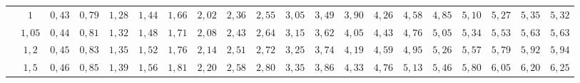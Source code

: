 \begin{table}[]
{\begin{tabular}{|c|c|c|c|c|c|c|c|c|c|c|c|c|c|c|c|c|c|c|c|}
                        & $1$                                                                                 & \cellcolor[HTML]{FFCCC9}$0,43$ & \cellcolor[HTML]{FFCCC9}$0,79$ & \cellcolor[HTML]{FFCCC9}$1,28$ & \cellcolor[HTML]{FFCCC9}$1,44$ & \cellcolor[HTML]{FFCCC9}$1,66$ & \cellcolor[HTML]{FD6864}$2,02$ & \cellcolor[HTML]{FD6864}$2,36$ & \cellcolor[HTML]{FD6864}$2,55$ & \cellcolor[HTML]{FE0000}$3,05$ & \cellcolor[HTML]{FE0000}$3,49$ & \cellcolor[HTML]{FE0000}$3,90$ & \cellcolor[HTML]{CB0000}$4,26$ & \cellcolor[HTML]{CB0000}$4,58$                        & \cellcolor[HTML]{9A0000}$4,85$ & \cellcolor[HTML]{9A0000}$5,10$ & \cellcolor[HTML]{F8A102}$5,27$ & \cellcolor[HTML]{F8A102}$5,35$ & \cellcolor[HTML]{F56B00}$5,32$ \\ \cline{2-20} 
                        & $1,05$                                                                              & \cellcolor[HTML]{FFCCC9}$0,44$ & \cellcolor[HTML]{FFCCC9}$0,81$ & \cellcolor[HTML]{FFCCC9}$1,32$ & \cellcolor[HTML]{FFCCC9}$1,48$ & \cellcolor[HTML]{FFCCC9}$1,71$ & \cellcolor[HTML]{FD6864}$2,08$ & \cellcolor[HTML]{FD6864}$2,43$ & \cellcolor[HTML]{FD6864}$2,64$ & \cellcolor[HTML]{FE0000}$3,15$ & \cellcolor[HTML]{FE0000}$3,62$ & \cellcolor[HTML]{FE0000}$4,05$ & \cellcolor[HTML]{CB0000}$4,43$ & \cellcolor[HTML]{CB0000}$4,76$                        & \cellcolor[HTML]{9A0000}$5,05$ & \cellcolor[HTML]{9A0000}$5,34$ & \cellcolor[HTML]{F8A102}$5,53$ & \cellcolor[HTML]{F8A102}$5,63$ & \cellcolor[HTML]{F56B00}$5,63$ \\ \cline{2-20} 
                        & $1,2$                                                                               & \cellcolor[HTML]{FFCCC9}$0,45$ & \cellcolor[HTML]{FFCCC9}$0,83$ & \cellcolor[HTML]{FFCCC9}$1,35$ & \cellcolor[HTML]{FFCCC9}$1,52$ & \cellcolor[HTML]{FFCCC9}$1,76$ & \cellcolor[HTML]{FD6864}$2,14$ & \cellcolor[HTML]{FD6864}$2,51$ & \cellcolor[HTML]{FD6864}$2,72$ & \cellcolor[HTML]{FE0000}$3,25$ & \cellcolor[HTML]{FE0000}$3,74$ & \cellcolor[HTML]{FE0000}$4,19$ & \cellcolor[HTML]{CB0000}$4,59$ & \cellcolor[HTML]{CB0000}$4,95$                        & \cellcolor[HTML]{9A0000}$5,26$ & \cellcolor[HTML]{9A0000}$5,57$ & \cellcolor[HTML]{F8A102}$5,79$ & \cellcolor[HTML]{F8A102}$5,92$ & \cellcolor[HTML]{F56B00}$5,94$ \\ \cline{2-20} 
                        & $1,5$                                                                               & \cellcolor[HTML]{FFCCC9}$0,46$ & \cellcolor[HTML]{FFCCC9}$0,85$ & \cellcolor[HTML]{FFCCC9}$1,39$ & \cellcolor[HTML]{FFCCC9}$1,56$ & \cellcolor[HTML]{FFCCC9}$1,81$ & \cellcolor[HTML]{FD6864}$2,20$ & \cellcolor[HTML]{FD6864}$2,58$ & \cellcolor[HTML]{FD6864}$2,80$ & \cellcolor[HTML]{FE0000}$3,35$ & \cellcolor[HTML]{FE0000}$3,86$ & \cellcolor[HTML]{FE0000}$4,33$ & \cellcolor[HTML]{CB0000}$4,76$ & \cellcolor[HTML]{CB0000}$5,13$                        & \cellcolor[HTML]{9A0000}$5,46$ & \cellcolor[HTML]{9A0000}$5,80$ & \cellcolor[HTML]{F8A102}$6,05$ & \cellcolor[HTML]{F8A102}$6,20$ & \cellcolor[HTML]{F56B00}$6,25$ \\ \cline{2-20} 

\end{tabular}}
\end{table}
